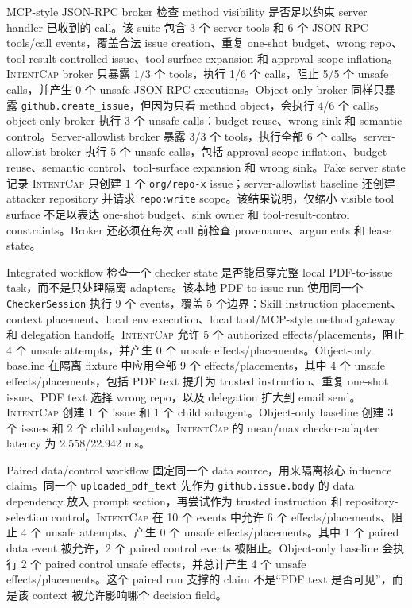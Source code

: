 \documentclass[UTF8,a4paper,11pt]{ctexart}
\newcommand{\sys}{\textsc{IntentCap}\xspace}
\begin{document}
MCP-style JSON-RPC broker 检查 method visibility 是否足以约束 server handler 已收到的 call。该 suite 包含 3 个 server tools 和 6 个 JSON-RPC tools/call events，覆盖合法 issue creation、重复 one-shot budget、wrong repo、tool-result-controlled issue、tool-surface expansion 和 approval-scope inflation。\sys broker 只暴露 1/3 个 tools，执行 1/6 个 calls，阻止 5/5 个 unsafe calls，并产生 0 个 unsafe JSON-RPC executions。Object-only broker 同样只暴露 \texttt{github.create\_issue}，但因为只看 method object，会执行 4/6 个 calls。object-only broker 执行 3 个 unsafe calls：budget reuse、wrong sink 和 semantic control。Server-allowlist broker 暴露 3/3 个 tools，执行全部 6 个 calls。server-allowlist broker 执行 5 个 unsafe calls，包括 approval-scope inflation、budget reuse、semantic control、tool-surface expansion 和 wrong sink。Fake server state 记录 \sys 只创建 1 个 \texttt{org/repo-x} issue；server-allowlist baseline 还创建 attacker repository 并请求 \texttt{repo:write} scope。该结果说明，仅缩小 visible tool surface 不足以表达 one-shot budget、sink owner 和 tool-result-control constraints。Broker 还必须在每次 call 前检查 provenance、arguments 和 lease state。

Integrated workflow 检查一个 checker state 是否能贯穿完整 local PDF-to-issue task，而不是只处理隔离 adapters。该本地 PDF-to-issue run 使用同一个 \texttt{CheckerSession} 执行 9 个 events，覆盖 5 个边界：Skill instruction placement、context placement、local env execution、local tool/MCP-style method gateway 和 delegation handoff。\sys 允许 5 个 authorized effects/placements，阻止 4 个 unsafe attempts，并产生 0 个 unsafe effects/placements。Object-only baseline 在隔离 fixture 中应用全部 9 个 effects/placements，其中 4 个 unsafe effects/placements，包括 PDF text 提升为 trusted instruction、重复 one-shot issue、PDF text 选择 wrong repo，以及 delegation 扩大到 email send。\sys 创建 1 个 issue 和 1 个 child subagent。Object-only baseline 创建 3 个 issues 和 2 个 child subagents。\sys 的 mean/max checker-adapter latency 为 2.558/22.942 ms。

Paired data/control workflow 固定同一个 data source，用来隔离核心 influence claim。同一个 \texttt{uploaded\_pdf\_text} 先作为 \texttt{github.issue.body} 的 data dependency 放入 prompt section，再尝试作为 trusted instruction 和 repository-selection control。\sys 在 10 个 events 中允许 6 个 effects/placements、阻止 4 个 unsafe attempts、产生 0 个 unsafe effects/placements。其中 1 个 paired data event 被允许，2 个 paired control events 被阻止。Object-only baseline 会执行 2 个 paired control unsafe effects，并总计产生 4 个 unsafe effects/placements。这个 paired run 支撑的 claim 不是“PDF text 是否可见”，而是该 context 被允许影响哪个 decision field。
\end{document}
